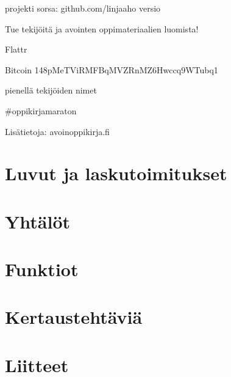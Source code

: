 
projekti
sorsa: github.com/linjaaho
versio


Tue tekijöitä ja avointen oppimateriaalien luomista!

Flattr

Bitcoin
148pMeTViRMFBqMVZRnMZ6Hwccq9WTubq1


pienellä tekijöiden nimet

#oppikirjamaraton


Lisätietoja: avoinoppikirja.fi

\tableofcontents



\part{Luvut ja laskutoimitukset}
    
    
    
    
    
    
    
    
    

\part{Yhtälöt}
    
    
    
    
    
    
    
\part{Funktiot}
    
    
    
    
    

\part{Kertaustehtäviä}
    
    
    


\part*{Liitteet}
\appendix
    
    
    
    
    
    
    
    
